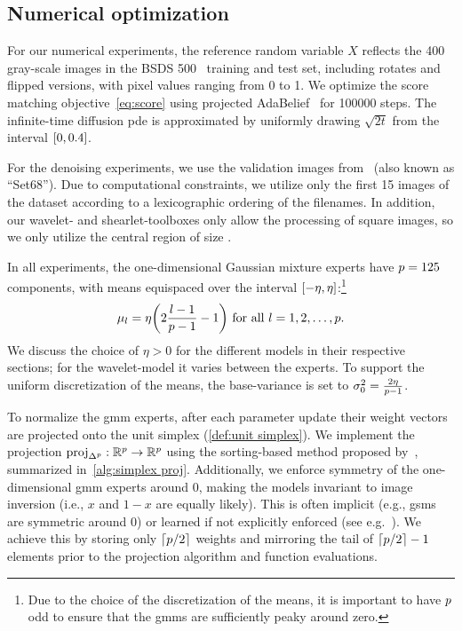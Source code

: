 \subsection{Numerical optimization}%
\label{ssec:implementation details}
For our numerical experiments, the reference random variable \( X \) reflects the \num{400} gray-scale images in the BSDS 500~\cite{martin_database_2001} training and test set, including rotates and flipped versions, with pixel values ranging from \num{0} to \num{1}.
We optimize the score matching objective~\eqref{eq:score} using projected AdaBelief~\cite{zhuang2020adabelief} for \num{100000} steps.
The infinite-time diffusion \gls{pde} is approximated by uniformly drawing \( \sqrt{\num{2}t} \) from the interval \( \interval{\num{0}}{\num{0.4}} \).

For the denoising experiments, we use the validation images from~\cite{RoBl09} (also known as \enquote{Set\num{68}}).
Due to computational constraints, we utilize only the first \num{15} images of the dataset according to a lexicographic ordering of the filenames.
In addition, our wavelet- and shearlet-toolboxes only allow the processing of square images, so we only utilize the central region of size .

In all experiments, the one-dimensional Gaussian mixture experts have \( p = \num{125} \) components, with means equispaced over the interval \( \interval{-\eta}{\eta} \):\footnote{%
	Due to the choice of the discretization of the means, it is important to have \( p \) odd to ensure that the \glspl{gmm} are sufficiently peaky around zero.
}
\begin{equation}
	\mu_l = \eta \biggl(\num{2} \frac{l - \num{1}}{\NumComponents - \num{1}} - \num{1}\biggr)\ \text{for all}\ l=\num{1}, \num{2}, \dotsc, \NumComponents.
	\label{eq:discretization}
\end{equation}
We discuss the choice of \( \eta > \num{0} \) for the different models in their respective sections;
for the wavelet-model it varies between the experts.
To support the uniform discretization of the means, the base-variance is set to \( \sigma_{\num{0}}^{\num{2}} = \frac{\num{2}\eta}{p - \num{1}} \).

To normalize the \gls{gmm} experts, after each parameter update their weight vectors are projected onto the unit simplex (\cref{def:unit simplex}).
We implement the projection \( \operatorname{proj}_{\Delta^{p}} : \mathbb{R}^p \to \mathbb{R}^p \) using the sorting-based method proposed by~\cite{Held1974}, summarized in~\cref{alg:simplex proj}.
Additionally, we enforce symmetry of the one-dimensional \gls{gmm} experts around \num{0}, making  the models invariant to image inversion (i.e., \( x \) and \( \num{1} - x \) are equally likely).
This is often implicit (e.g., \glspl{gsm} are symmetric around 0) or learned if not explicitly enforced (see e.g.~\cite[fig. 5]{chen_tnrd_2017}).
We achieve this by storing only \( \lceil p / \num{2} \rceil \) weights and mirroring the tail of \( \lceil p / \num{2} \rceil - \num{1} \) elements prior to the projection algorithm and function evaluations.

